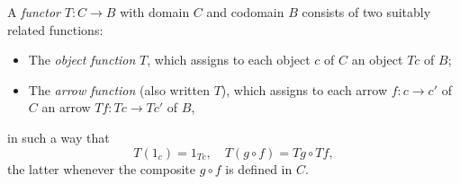 A \emph{functor} $T: C \rightarrow B$ with domain $C$ and codomain $B$ consists of two suitably related functions:
\begin{itemize}
\item The \emph{object function} $T$, which assigns to each object $c$ of $C$ an object $Tc$ of $B$;
\item The \emph{arrow function} (also written $T$), which assigns to each arrow $f: c \rightarrow c'$ of $C$ an arrow $Tf: Tc \rightarrow Tc'$ of $B$,
\end{itemize}
in such a way that
$$T(1_c) = 1_{Tc}, \quad T(g \circ f) = Tg \circ Tf,$$
the latter whenever the composite $g \circ f$ is defined in $C$.
